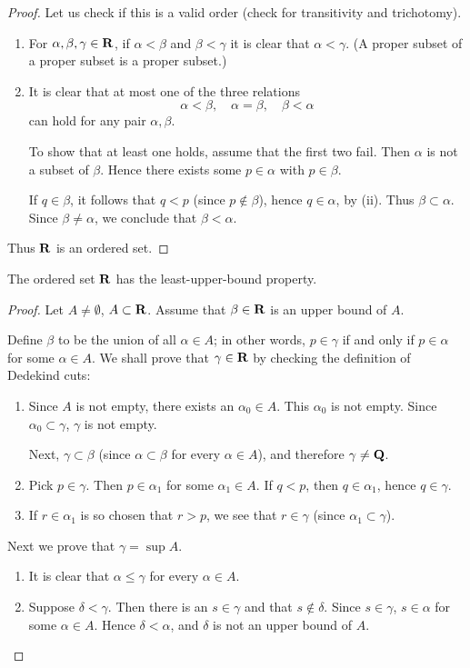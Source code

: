 \begin{proof}
Let us check if this is a valid order (check for transitivity and trichotomy).
\begin{enumerate}[label=(\roman*)]
\item For $\alpha,\beta,\gamma\in\mathbf R$, if $\alpha<\beta$ and $\beta<\gamma$ it is clear that $\alpha<\gamma$. (A proper subset of a proper subset is a proper subset.)

\item It is clear that at most one of the three relations
\[ \alpha<\beta, \quad \alpha=\beta, \quad \beta<\alpha \]
can hold for any pair $\alpha,\beta$. 

To show that at least one holds, assume that the first two fail. Then $\alpha$ is not a subset of $\beta$. Hence there exists some $p\in\alpha$ with $p\in\beta$.

If $q\in\beta$, it follows that $q<p$ (since $p\notin\beta$), hence $q\in\alpha$, by (ii). Thus $\beta\subset\alpha$. Since $\beta\neq\alpha$, we conclude that $\beta<\alpha$.
\end{enumerate}
Thus $\mathbf R$ is an ordered set.
\end{proof}

\begin{proposition*}
The ordered set $\mathbf R$ has the least-upper-bound property.
\end{proposition*}

\begin{proof}
Let $A\neq\emptyset$, $A\subset\mathbf R$. Assume that $\beta\in\mathbf R$ is an upper bound of $A$.

Define $\beta$ to be the union of all $\alpha\in A$; in other words, $p\in\gamma$ if and only if $p\in\alpha$ for some $\alpha\in A$. We shall prove that $\gamma\in\mathbf R$ by checking the definition of Dedekind cuts:
\begin{enumerate}[label=(\roman*)]
\item Since $A$ is not empty, there exists an $\alpha_0\in A$. This $\alpha_0$ is not empty. Since $\alpha_0\subset\gamma$, $\gamma$ is not empty.

Next, $\gamma\subset\beta$ (since $\alpha\subset\beta$ for every $\alpha\in A$), and therefore $\gamma\neq\mathbf Q$.

\item Pick $p\in\gamma$. Then $p\in\alpha_1$ for some $\alpha_1\in A$. If $q<p$, then $q\in\alpha_1$, hence $q\in\gamma$.

\item If $r\in\alpha_1$ is so chosen that $r>p$, we see that $r\in\gamma$ (since $\alpha_1\subset\gamma$).
\end{enumerate}

Next we prove that $\gamma=\sup A$.
\begin{enumerate}[label=(\roman*)]
\item It is clear that $\alpha\le\gamma$ for every $\alpha\in A$.
\item Suppose $\delta<\gamma$. Then there is an $s\in\gamma$ and that $s\notin\delta$. Since $s\in\gamma$, $s\in\alpha$ for some $\alpha\in A$. Hence $\delta<\alpha$, and $\delta$ is not an upper bound of $A$.
\end{enumerate}
\end{proof}

